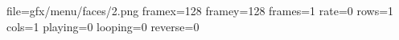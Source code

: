 file=gfx/menu/faces/2.png
framex=128
framey=128
frames=1
rate=0
rows=1
cols=1
playing=0
looping=0
reverse=0